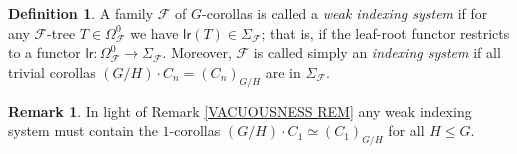 \documentclass[a4paper,10pt
,draft
]{article}%
\numberwithin{equation}{section}
\numberwithin{figure}{section}
\theoremstyle{definition} %
\newtheorem{definition}[equation]{Definition}%
\newtheorem{remark}[equation]{Remark}%
\newcommand{\Fin}{\mathsf{F}}%
\newcommand{\1}{\ensuremath{\mathbbm 1}}%
\begin{document}




\begin{definition}\label{INDEXSYS DEF}
	A family $\mathcal{F}$ of $G$-corollas is called a 
	\textit{weak indexing system}
	if for any $\mathcal{F}$-tree $T \in \Omega_{\mathcal{F}}^0$ we have 
	$\mathsf{lr}(T) \in \Sigma_{\mathcal{F}}$;
        that is, if the leaf-root functor restricts to a functor
	$\mathsf{lr} \colon \Omega_{\mathcal{F}}^0 \to \Sigma_{\mathcal{F}}$.
Moreover, $\mathcal{F}$ is called simply an \textit{indexing system} if all trivial corollas 
$(G/H)\cdot C_n = (C_n)_{G/H}$ are in $\Sigma_{\mathcal{F}}$.
\end{definition}


\begin{remark}
	In light of Remark \ref{VACUOUSNESS REM} any weak indexing system must contain the $1$-corollas $(G/H) \cdot C_1 \simeq (C_1)_{G/H}$ for all $H\leq G$.
\end{remark}
\end{document}
